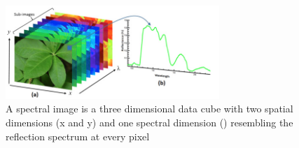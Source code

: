 \documentclass{article}
\begin{document}
{                \begin{figure}[htb]
                    \centering
                    \includegraphics[width=0.72\textwidth]{Figures/pixelCube.PNG}
                    \caption{ A spectral image is a three dimensional data cube with two spatial dimensions (x and y) and one spectral dimension (\λ) resembling the reflection spectrum at every pixel}
                    \label{fig:example}
                \end{figure}
                
}
\end{document}
